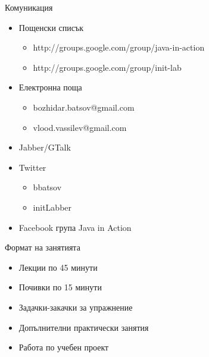 \documentclass{beamer}
\begin{document}
\begin{frame}{Комуникация}
  \transdissolve
  \begin{itemize}
  \item Пощенски списък 
    \begin{itemize}
    \item http://groups.google.com/group/java-in-action
    \item http://groups.google.com/group/init-lab
    \end{itemize}
    \pause
  \item Електронна поща
    \begin{itemize}
      \item bozhidar.batsov@gmail.com
      \item vlood.vassilev@gmail.com
    \end{itemize}
    \pause
  \item Jabber/GTalk
    \pause
  \item Twitter
    \begin{itemize}
      \item bbatsov
      \item initLabber
    \end{itemize}
    \pause
  \item Facebook група Java in Action
  \end{itemize}
\end{frame}

\begin{frame}{Формат на занятията}
  \transdissolve
  \begin{itemize}
  \item Лекции по 45 минути
  \item Почивки по 15 минути
  \item Задачки-закачки за упражнение
  \item Допълнителни практически занятия
  \item Работа по учебен проект
  \end{itemize}
\end{frame}
\end{document}
